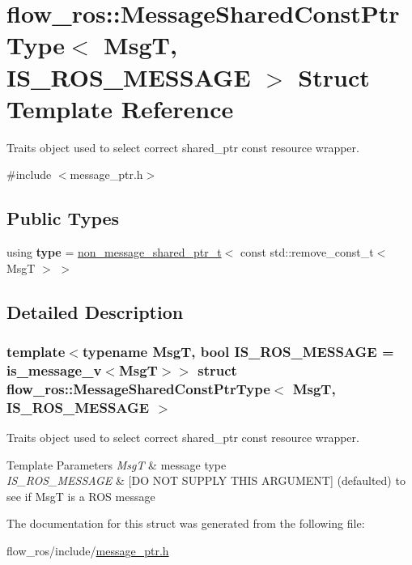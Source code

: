 \hypertarget{structflow__ros_1_1_message_shared_const_ptr_type}{}\section{flow\+\_\+ros\+:\+:Message\+Shared\+Const\+Ptr\+Type$<$ MsgT, I\+S\+\_\+\+R\+O\+S\+\_\+\+M\+E\+S\+S\+A\+GE $>$ Struct Template Reference}
\label{structflow__ros_1_1_message_shared_const_ptr_type}


Traits object used to select correct shared\+\_\+ptr const resource wrapper.  




{\ttfamily \#include $<$message\+\_\+ptr.\+h$>$}

\subsection*{Public Types}
\begin{DoxyCompactItemize}
\item 
\mbox{\label{structflow__ros_1_1_message_shared_const_ptr_type_aa54b6baec54b3a19815aa429b42ae97c}} 
using {\bfseries type} = \hyperlink{namespaceflow__ros_aa27be896eb2c4c34fef0e9b7dd444d4c}{non\+\_\+message\+\_\+shared\+\_\+ptr\+\_\+t}$<$ const std\+::remove\+\_\+const\+\_\+t$<$ MsgT $>$ $>$
\end{DoxyCompactItemize}


\subsection{Detailed Description}
\subsubsection*{template$<$typename MsgT, bool I\+S\+\_\+\+R\+O\+S\+\_\+\+M\+E\+S\+S\+A\+GE = is\+\_\+message\+\_\+v$<$\+Msg\+T$>$$>$\newline
struct flow\+\_\+ros\+::\+Message\+Shared\+Const\+Ptr\+Type$<$ Msg\+T, I\+S\+\_\+\+R\+O\+S\+\_\+\+M\+E\+S\+S\+A\+G\+E $>$}

Traits object used to select correct shared\+\_\+ptr const resource wrapper. 


\begin{DoxyTemplParams}{Template Parameters}
{\em MsgT} & message type \\
\hline
{\em I\+S\+\_\+\+R\+O\+S\+\_\+\+M\+E\+S\+S\+A\+GE} & \mbox{[}DO N\+OT S\+U\+P\+P\+LY T\+H\+IS A\+R\+G\+U\+M\+E\+NT\mbox{]} (defaulted) to see if MsgT is a R\+OS message \\
\hline
\end{DoxyTemplParams}


The documentation for this struct was generated from the following file\+:\begin{DoxyCompactItemize}
\item 
flow\+\_\+ros/include/\hyperlink{message__ptr_8h}{message\+\_\+ptr.\+h}\end{DoxyCompactItemize}
